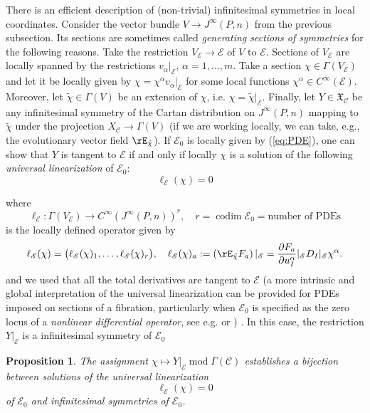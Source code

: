 \documentclass{conm-p-l}
\newtheorem{proposition}[theorem]{Proposition}
\theoremstyle{definition}
\theoremstyle{remark}
\numberwithin{equation}{section}
\begin{document}
There is an efficient description of (non-trivial) infinitesimal symmetries in local coordinates. Consider the vector bundle $V \to J^\infty (P, n)$ from the previous subsection. Its sections are sometimes called \emph{generating sections of symmetries} for the following reasons. Take the restriction $V_{\mathscr E} \to \mathscr E$ of $V$ to $\mathscr E$. Sections of $V_{\mathscr E}$ are locally spanned by the restrictions $v_\alpha|_{\mathscr E}$, $\alpha = 1, \ldots, m$. Take a section $\chi \in \Gamma (V_{\mathscr E})$ and let it be locally given by $\chi = \chi^\alpha v_\alpha|_{\mathscr E}$ for some local functions $\chi^\alpha \in C^\infty (\mathscr E)$. Moreover, let $\tilde \chi \in \Gamma (V)$ be an extension of $\chi$, i.e.{} $\chi = \tilde \chi|_{\mathscr E}$. Finally, let $Y \in \mathfrak X_{\mathscr C}$ be any infinitesimal symmetry of the Cartan distribution on $J^\infty (P, n)$ mapping to $\tilde \chi$ under the projection $X_{\mathscr C} \to \Gamma (V)$ (if we are working locally, we can take, e.g., the evolutionary vector field $\rE_{\tilde \chi}$). If $\mathscr E_0$ is locally given by (\ref{eq:PDE}), one can show that $Y$ is tangent to $\mathscr E$ if and only if locally $\chi$ is a solution of the following \emph{universal linearization} of $\mathscr E_0$:
\[
\ell_{\mathscr E} (\chi) = 0 
\]
 
where 
\[
\ell_{\mathscr E} : \Gamma (V_\mathcal E) \to C^\infty (J^\infty (P,n))^r, \quad r = \operatorname{codim} \mathscr E_0 = \text{number of PDEs}
\]
is the locally defined operator given by
\[
\ell_{\mathscr E}(\chi) = \big( \ell_{\mathscr E}(\chi)_1, \ldots, \ell_{\mathscr E}(\chi)_r \big), \quad \ell_{\mathscr E}(\chi)_a := \left(\rE_{\tilde \chi} F_a\right)|_{\mathscr E} = \frac{\partial F_a}{\partial u^\alpha_I}|_{\mathscr E} D_I|_{\mathscr E} \chi^\alpha.
\]
and    we used that all the total derivatives are tangent to $\mathscr E$  (a more intrinsic and global interpretation of the universal linearization can be provided for PDEs imposed on sections of a fibration, particularly when $\mathcal E_0$ is specified as the zero locus of a \emph{nonlinear differential operator}, see e.g.{} \cite[Chapter 4, Section 2.7]{b...99} or \cite[Section 3.9]{kv98})  . In this case, the restriction $Y|_{\mathscr E}$ is a infinitesimal symmetry of $\mathscr E_0$  

\begin{proposition}
The assignment $\chi \mapsto Y|_{\mathscr E} \operatorname{mod} \Gamma (\mathscr C)$ establishes a bijection between solutions of the universal linearization
\[
\ell_{\mathscr E} (\chi) = 0
\]
of $\mathscr E_0$ and infinitesimal symmetries of $\mathscr E_0$.
\end{proposition}
\end{document}
